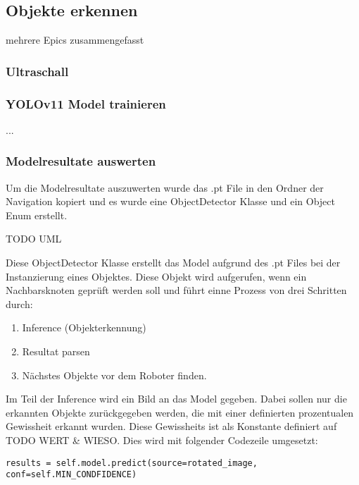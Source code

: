 
\subsection{Objekte erkennen}

mehrere Epics zusammengefasst 

\subsubsection{Ultraschall}

\subsubsection{YOLOv11 Model trainieren}

...

\subsubsection{Modelresultate auswerten}
\label{model-results}

Um die Modelresultate auszuwerten wurde das .pt File in den Ordner der Navigation kopiert und es wurde eine ObjectDetector Klasse und ein Object Enum erstellt.

TODO UML

Diese ObjectDetector Klasse erstellt das Model aufgrund des .pt Files bei der Instanzierung eines Objektes. Diese Objekt wird aufgerufen, wenn ein Nachbarsknoten geprüft werden soll und führt einne Prozess von drei Schritten durch:

\begin{enumerate}
    \item Inference (Objekterkennung)
    \item Resultat parsen
    \item Nächstes Objekte vor dem Roboter finden.
\end{enumerate}

Im Teil der Inference wird ein Bild an das Model gegeben. Dabei sollen nur die erkannten Objekte zurückgegeben werden, die mit einer definierten prozentualen Gewissheit erkannt wurden. Diese Gewissheits ist als Konstante definiert auf TODO WERT \& WIESO. Dies wird mit folgender Codezeile umgesetzt:
\begin{verbatim}
results = self.model.predict(source=rotated_image, conf=self.MIN_CONDFIDENCE)
\end{verbatim}

